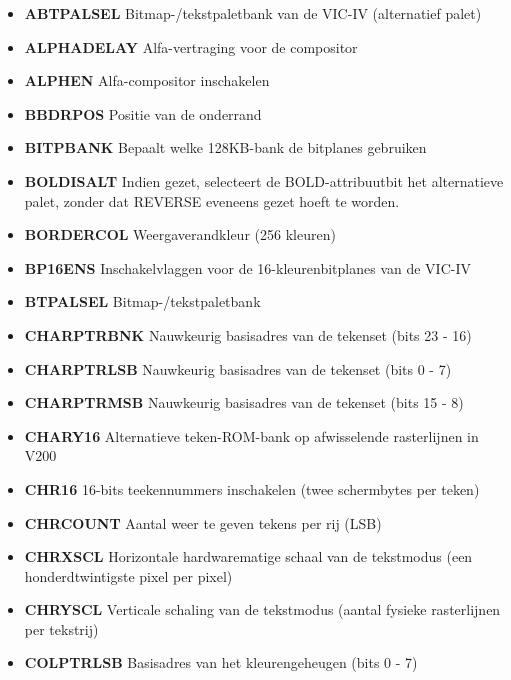 \begin{itemize}
\item{\bf{ABTPALSEL}} Bitmap-/tekstpaletbank van de VIC-IV (alternatief palet)
\item{\bf{ALPHADELAY}} Alfa-vertraging voor de compositor
\item{\bf{ALPHEN}} Alfa-compositor inschakelen
\item{\bf{BBDRPOS}} Positie van de onderrand
\item{\bf{BITPBANK}} Bepaalt welke 128KB-bank de bitplanes gebruiken
\item{\bf{BOLDISALT}} Indien gezet, selecteert de BOLD-attribuutbit het alternatieve palet, zonder dat REVERSE eveneens gezet hoeft te worden.
\item{\bf{BORDERCOL}} Weergaverandkleur (256 kleuren)
\item{\bf{BP16ENS}} Inschakelvlaggen voor de 16-kleurenbitplanes van de VIC-IV
\item{\bf{BTPALSEL}} Bitmap-/tekstpaletbank
\item{\bf{CHARPTRBNK}} Nauwkeurig basisadres van de tekenset (bits 23 - 16)
\item{\bf{CHARPTRLSB}} Nauwkeurig basisadres van de tekenset (bits 0 - 7)
\item{\bf{CHARPTRMSB}} Nauwkeurig basisadres van de tekenset (bits 15 - 8)
\item{\bf{CHARY16}} Alternatieve teken-ROM-bank op afwisselende rasterlijnen in V200
\item{\bf{CHR16}} 16-bits teekennummers inschakelen (twee schermbytes per teken)
\item{\bf{CHRCOUNT}} Aantal weer te geven tekens per rij (LSB)
\item{\bf{CHRXSCL}} Horizontale hardwarematige schaal van de tekstmodus (een honderdtwintigste pixel per pixel)
\item{\bf{CHRYSCL}} Verticale schaling van de tekstmodus (aantal fysieke rasterlijnen per tekstrij)
\item{\bf{COLPTRLSB}} Basisadres van het kleurengeheugen (bits 0 - 7)

\end{itemize}
